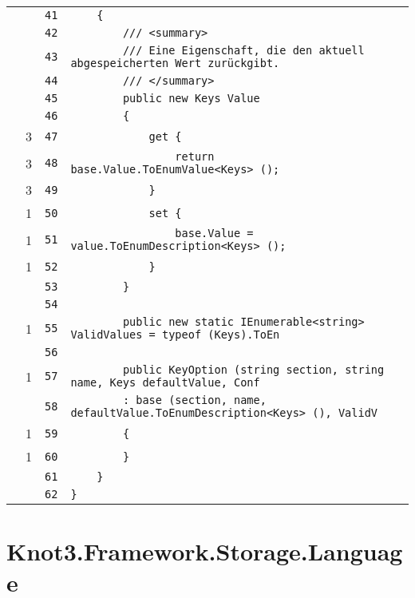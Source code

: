 \documentclass[a4paper,10pt]{article}
\begin{document}
\begin{longtable}[l]{lrrl}
\cellcolor{gray} &  & \verb~41~ & \verb~    {~\\
\cellcolor{gray} &  & \verb~42~ & \verb~        /// <summary>~\\
\cellcolor{gray} &  & \verb~43~ & \verb~        /// Eine Eigenschaft, die den aktuell abgespeicherten Wert zurückgibt.~\\
\cellcolor{gray} &  & \verb~44~ & \verb~        /// </summary>~\\
\cellcolor{gray} &  & \verb~45~ & \verb~        public new Keys Value~\\
\cellcolor{gray} &  & \verb~46~ & \verb~        {~\\
\cellcolor{green} & 3 & \verb~47~ & \verb~            get {~\\
\cellcolor{green} & 3 & \verb~48~ & \verb~                return base.Value.ToEnumValue<Keys> ();~\\
\cellcolor{green} & 3 & \verb~49~ & \verb~            }~\\
\cellcolor{green} & 1 & \verb~50~ & \verb~            set {~\\
\cellcolor{green} & 1 & \verb~51~ & \verb~                base.Value = value.ToEnumDescription<Keys> ();~\\
\cellcolor{green} & 1 & \verb~52~ & \verb~            }~\\
\cellcolor{gray} &  & \verb~53~ & \verb~        }~\\
\cellcolor{gray} &  & \verb~54~ & \verb~~\\
\cellcolor{green} & 1 & \verb~55~ & \verb~        public new static IEnumerable<string> ValidValues = typeof (Keys).ToEn~\\
\cellcolor{gray} &  & \verb~56~ & \verb~~\\
\cellcolor{green} & 1 & \verb~57~ & \verb~        public KeyOption (string section, string name, Keys defaultValue, Conf~\\
\cellcolor{gray} &  & \verb~58~ & \verb~        : base (section, name, defaultValue.ToEnumDescription<Keys> (), ValidV~\\
\cellcolor{green} & 1 & \verb~59~ & \verb~        {~\\
\cellcolor{green} & 1 & \verb~60~ & \verb~        }~\\
\cellcolor{gray} &  & \verb~61~ & \verb~    }~\\
\cellcolor{gray} &  & \verb~62~ & \verb~}~\\
\end{longtable}
\newpage
\section{Knot3.Framework.Storage.Language}
\end{document}
